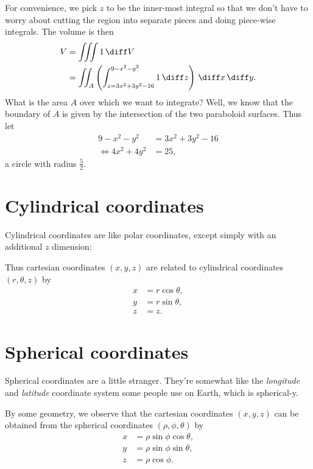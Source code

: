 \documentclass{multi}
\begin{document}
For convenience, we pick \(z\) to be the inner-most integral so that we don't have to worry about cutting the region into separate pieces and doing piece-wise integrals. The volume is then
\begin{align*}
    V &= \iiint 1 \, \diff V \\
    &= \iint_{A} \left(\int_{z=3x^2 + 3y^2 - 16}^{9-x^2-y^2} 1 \, \diff z\right) \, \diff x \, \diff y.
\end{align*}
What is the area \(A\) over which we want to integrate? Well, we know that the boundary of \(A\) is given by the intersection of the two paraboloid surfaces. Thus let
\begin{align*}
    9 - x^2 - y^2 &= 3x^2 + 3y^2 - 16 \\
    \iff 4x^2 + 4y^2 &= 25,
\end{align*}
a circle with radius \(\frac 5 2\). 

\section*{Cylindrical coordinates}

Cylindrical coordinates are like polar coordinates, except simply with an additional \(z\) dimension:

Thus cartesian coordinates \((x, y, z)\) are related to cylindrical coordinates \((r, \theta, z)\) by
\begin{align*}
    x &= r \cos \theta, \\
    y &= r \sin \theta, \\
    z &= z.
\end{align*}

\section*{Spherical coordinates}

Spherical coordinates are a little stranger. They're somewhat like the \emph{longitude} and \emph{latitude} coordinate system some people use on Earth, which is spherical-y. 


By some geometry, we observe that the cartesian coordinates \((x, y, z)\) can be obtained from the spherical coordinates \((\rho, \phi, \theta)\) by
\begin{align*}
    x &= \rho \sin \phi \cos \theta, \\
    y &= \rho \sin \phi \sin \theta, \\
    z &= \rho \cos \phi.
\end{align*}
\end{document}
